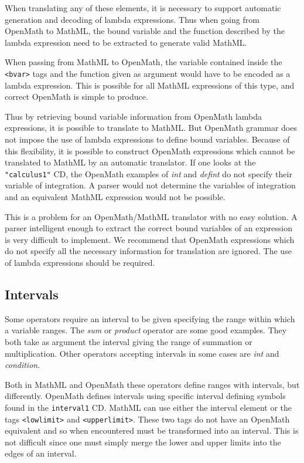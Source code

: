 When translating any of these elements, it is necessary to support
automatic generation and decoding of lambda expressions. Thus when
going from OpenMath to MathML, the bound variable and the function
described by the lambda expression need to be extracted to generate
valid MathML.

When passing from MathML to OpenMath, the variable contained inside the
\verb|<bvar>| tags and the function given as argument would have to be
encoded as a lambda expression. This is possible for all MathML
expressions of this type, and correct OpenMath is simple to produce.

Thus by retrieving bound variable information from OpenMath lambda
expressions, it is possible to translate to MathML. But OpenMath
grammar does not impose the use of lambda expressions to define bound
variables. Because of this flexibility, it is possible to construct
OpenMath expressions which cannot be translated to MathML by an
automatic translator. If one looks at the \verb|"calculus1"| CD, the
OpenMath examples of {\it int} and {\it defint} do not specify their
variable of integration. A parser would not determine the variables of
integration and an equivalent MathML expression would not be possible.

This is a problem for an OpenMath/MathML translator with no easy
solution. A parser intelligent enough to extract the correct bound
variables of an expression is very difficult to implement. We recommend
that OpenMath expressions which do not specify all the necessary
information for translation are ignored. The use of lambda expressions
should be required.

\subsection{Intervals}

Some operators require an interval to be given specifying the range
within which a variable ranges. The {\it sum} or {\it product} operator
are some good examples. They both take as argument the interval giving
the range of summation or multiplication. Other operators accepting 
intervals in some cases are {\it int} and {\it condition}.

Both in MathML and OpenMath these operators define ranges with
intervals, but differently. OpenMath defines intervals using specific
interval defining symbols found in the {\tt interval1} CD. MathML can
use either the interval element or the tags \verb|<lowlimit>| and
\verb|<upperlimit>|. These two tags do not have an OpenMath equivalent
and so when encountered must be transformed into an interval. This is
not difficult since one must simply merge the lower and upper limits
into the edges of an interval.

